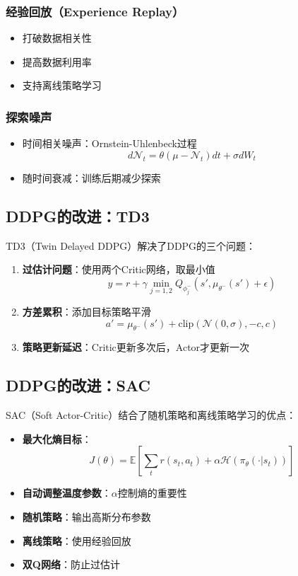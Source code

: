 \subsubsection{经验回放（Experience Replay）}
\begin{itemize}
    \item 打破数据相关性
    \item 提高数据利用率
    \item 支持离线策略学习
\end{itemize}

\subsubsection{探索噪声}
\begin{itemize}
    \item 时间相关噪声：Ornstein-Uhlenbeck过程
    \[
    d\mathcal{N}_t = \theta(\mu - \mathcal{N}_t)dt + \sigma dW_t
    \]
    \item 随时间衰减：训练后期减少探索
\end{itemize}

\subsection{DDPG的改进：TD3}

TD3（Twin Delayed DDPG）解决了DDPG的三个问题：

\begin{enumerate}
    \item \textbf{过估计问题}：使用两个Critic网络，取最小值
    \[
    y = r + \gamma \min_{j=1,2} Q_{\phi_j^-}(s', \mu_{\theta^-}(s') + \epsilon)
    \]
    \item \textbf{方差累积}：添加目标策略平滑
    \[
    a' = \mu_{\theta^-}(s') + \text{clip}(\mathcal{N}(0, \sigma), -c, c)
    \]
    \item \textbf{策略更新延迟}：Critic更新多次后，Actor才更新一次
\end{enumerate}

\subsection{DDPG的改进：SAC}

SAC（Soft Actor-Critic）结合了随机策略和离线策略学习的优点：

\begin{itemize}
    \item \textbf{最大化熵目标}：
    \[
    J(\theta) = \mathbb{E}\left[\sum_{t} r(s_t, a_t) + \alpha \mathcal{H}(\pi_\theta(\cdot|s_t))\right]
    \]
    \item \textbf{自动调整温度参数}：$\alpha$控制熵的重要性
    \item \textbf{随机策略}：输出高斯分布参数
    \item \textbf{离线策略}：使用经验回放
    \item \textbf{双Q网络}：防止过估计
\end{itemize}

